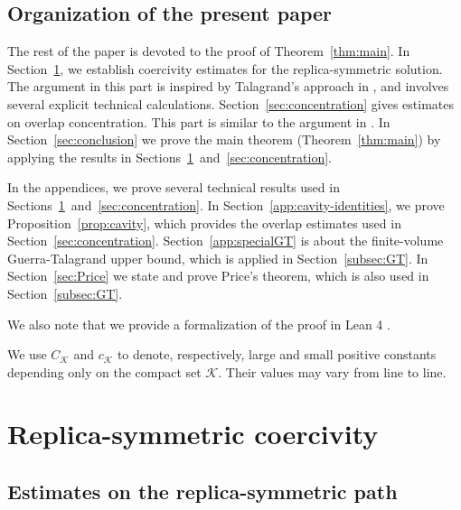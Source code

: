 \documentclass[11pt]{article}
\numberwithin{equation}{section}
\newcommand{\1}{\mathbf 1}
\begin{document}
\subsection{Organization of the present paper}

The rest of the paper is devoted to the proof of Theorem~\ref{thm:main}.
In Section~\ref{sec:coercivity}, we establish coercivity estimates for the replica-symmetric solution.   
The argument in this part is inspired by Talagrand's approach in \cite{TalagrandParisi}, and involves several  explicit technical  calculations. 
Section~\ref{sec:concentration} gives estimates on overlap concentration. This part is similar to the argument in \cite{KusuokaNakajima1}.
In Section~\ref{sec:conclusion} we prove the main theorem (Theorem~\ref{thm:main}) by applying the results in Sections~\ref{sec:coercivity}~and~\ref{sec:concentration}.

In the appendices, we prove several technical results used in Sections~\ref{sec:coercivity}~and~\ref{sec:concentration}. 
In Section~\ref{app:cavity-identities}, we prove  Proposition~\ref{prop:cavity}, which provides the overlap estimates used in Section~\ref{sec:concentration}. 
Section~\ref{app:specialGT} is about the finite-volume Guerra-Talagrand upper bound, which is applied in Section~\ref{subsec:GT}.
In Section~\ref{sec:Price} we state and prove Price's theorem, which is also used in Section~\ref{subsec:GT}. 

We also note that we provide a formalization of the proof in Lean 4 \cite{brabra}.


We use \(C_{\mathcal K}\) and \(c_{\mathcal K}\) to denote, respectively, large and small positive constants depending only on the compact set \(\mathcal K\). Their values may vary from line to line.

\section{Replica-symmetric coercivity}\label{sec:coercivity}


\subsection{Estimates on the replica-symmetric path}\label{subsec:ATsign}
\end{document}

